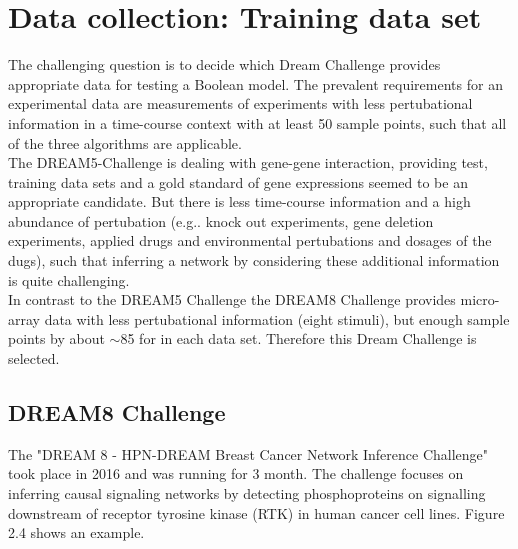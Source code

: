 \section{Data collection: Training data set }
The challenging question is to decide which Dream Challenge provides appropriate data for testing a Boolean model. The prevalent requirements for an experimental data are measurements of experiments with less pertubational information in a time-course context with at least 50 sample points, such that all of the three algorithms are applicable.\\
The DREAM5-Challenge is dealing with gene-gene interaction, providing test, training data sets and a gold standard of gene expressions seemed to be an appropriate candidate. But there is less time-course information and a high abundance of pertubation (\gls{e.g.}. knock out experiments, gene deletion experiments, applied drugs and environmental pertubations and dosages of the dugs), such that inferring a network by considering these additional information is quite challenging.\\In contrast to the DREAM5 Challenge the DREAM8 Challenge provides micro-array data with less pertubational information (eight stimuli), but enough sample points  by about $\sim $85 for in each data set. Therefore this Dream Challenge is selected.

\subsection{DREAM8 Challenge}
The "DREAM 8 - HPN-DREAM Breast Cancer Network Inference Challenge" took place in 2016 and was running for 3 month. The challenge focuses on inferring causal signaling networks by detecting phosphoproteins on signalling downstream of receptor tyrosine kinase (RTK) in human cancer cell lines. Figure 2.4 shows an example.

